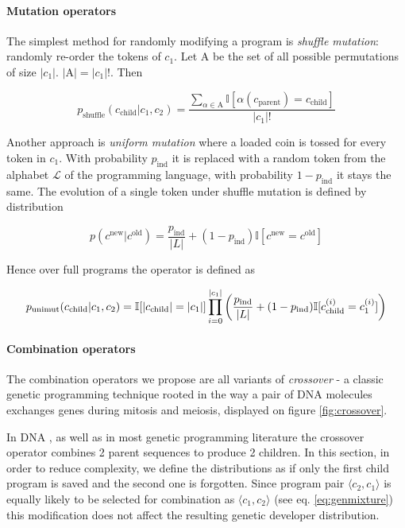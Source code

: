 \paragraph{Mutation operators}

The simplest method for randomly modifying a program is \emph{shuffle mutation}: randomly re-order the tokens of $c_1$.
Let $\mathrm{A}$ be the set of all possible permutations of size $|c_1|$. $|\mathrm{A}|=|c_1|!$. 
Then

\begin{equation}
    p_\text{shuffle}(c_\text{child}|c_1,c_2) =
            \frac{\sum\limits_{\alpha \in \mathrm{A}} \mathbb{I}[\alpha(c_\text{parent}) = c_\text{child}]}{|c_1|!}
\end{equation}

Another approach is \emph{uniform mutation} where a loaded coin is tossed for every token in $c_1$. 
With probability $p_\text{ind}$ it is replaced with a random token from the alphabet $\mathcal{L}$ of the programming language, with probability $1-p_\text{ind}$ it stays the same.
The evolution of a single token under shuffle mutation is defined by distribution

\begin{equation}
    p(c^\text{new} | c^\text{old}) = \frac{p_\text{ind}}{|L|} +  (1 - p_\text{ind}) \mathbb{I}[c^\text{new} = c^\text{old}]
\end{equation}

Hence over full programs the operator is defined as

\begin{equation}
    p_\text{unimut}(c_\text{child}|c_1,c_2) = \mathbb{I}[|c_\text{child}|=|c_1|] \\ 
    \prod\limits_{i=0}^{|c_1|}  \left(\frac{p_\text{ind}}{|L|} +  (1 - p_\text{ind}) \mathbb{I}[c_\text{child}^{(i)} = c_1^{(i)}] \right)
\end{equation}

\paragraph{Combination operators}

The combination operators we propose are all variants of \emph{crossover} - a classic genetic programming technique rooted in the way a pair of DNA molecules exchanges genes during mitosis and meiosis, displayed on figure \ref{fig:crossover}.

In DNA \cite{evocritique}, as well as in most genetic programming literature \cite{genprog1,genprog2,genprog1,genprog2ast} the crossover operator combines 2 parent sequences to produce 2 children.
In this section, in order to reduce complexity, we define the distributions as if only the first child program is saved and the second one is forgotten.
Since program pair $\langle c_2, c_1 \rangle$ is equally likely to be selected for combination as $\langle c_1, c_2 \rangle$ (see eq. \ref{eq:genmixture}) this modification does not affect the resulting genetic developer distribution.

